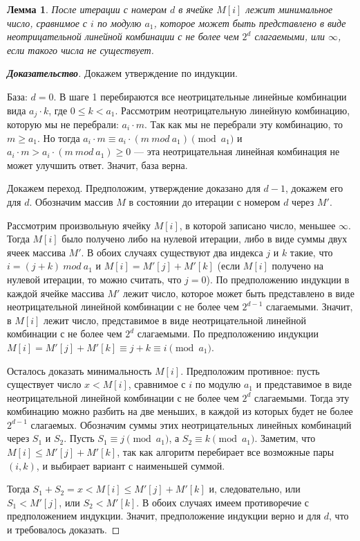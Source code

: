 \documentclass[12pt]{article}
\newtheorem{lemma}[theorem]{Лемма}
\theoremstyle{definition}
\begin{document}
\begin{lemma}
\label{algorithm:lemma2}
После итерации с номером $d$ в ячейке $M[i]$ лежит минимальное число, сравнимое с $i$ по модулю $a_1$, которое может быть представлено в виде неотрицательной линейной комбинации с не более чем $2^d$ слагаемыми, или $\infty$, если такого числа не существует.
\end{lemma}
\begin{proof}[\textbf{Доказательство}]
Докажем утверждение по индукции.

База: $d = 0$. В шаге 1 перебираются все неотрицательные линейные комбинации вида $a_j \cdot k$, где $0 \le k < a_1$. Рассмотрим неотрицательную линейную комбинацию, которую мы не перебрали: $a_i \cdot m$. Так как мы не перебрали эту комбинацию, то $m \ge a_1$. Но тогда $a_i \cdot m \equiv a_i \cdot (m \ mod \ a_1) \pmod {a_1}$ и $a_i \cdot m > a_i \cdot (m \ mod \ a_1) \ge 0$ --- эта неотрицательная линейная комбинация не может улучшить ответ. Значит, база верна.

Докажем переход. Предположим, утверждение доказано для $d - 1$, докажем его для $d$. Обозначим массив $M$ в состоянии до итерации с номером $d$ через $M'$.

Рассмотрим произвольную ячейку $M[i]$, в которой записано число, меньшее $\infty$. Тогда $M[i]$ было получено либо на нулевой итерации, либо в виде суммы двух ячеек массива $M'$. В обоих случаях существуют два индекса $j$ и $k$ такие, что $i = (j + k) \ mod \ a_1$ и $M[i] = M'[j] + M'[k]$ (если $M[i]$ получено на нулевой итерации, то можно считать, что $j = 0$). По предположению индукции в каждой ячейке массива $M'$ лежит число, которое может быть представлено в виде неотрицательной линейной комбинации с не более чем $2^{d - 1}$ слагаемыми. Значит, в $M[i]$ лежит число, представимое в виде неотрицательной линейной комбинации с не более чем $2^d$ слагаемыми. По предположению индукции $M[i] = M'[j] + M'[k] \equiv j + k \equiv i \pmod{a_1}$.

Осталось доказать минимальность $M[i]$. Предположим противное: пусть существует число $x < M[i]$, сравнимое с $i$ по модулю $a_1$ и представимое в виде неотрицательной линейной комбинации с не более чем $2^d$ слагаемыми. Тогда эту комбинацию можно разбить на две меньших, в каждой из которых будет не более $2^{d - 1}$ слагаемых. Обозначим суммы этих неотрицательных линейных комбинаций через $S_1$ и $S_2$. Пусть $S_1 \equiv j \pmod{a_1}$, а $S_2 \equiv k \pmod{a_1}$. Заметим, что $M[i] \le M'[j] + M'[k]$, так как алгоритм перебирает все возможные пары $(i, k)$, и выбирает вариант с наименьшей суммой.

Тогда $S_1 + S_2 = x < M[i] \le M'[j] + M'[k]$ и, следовательно, или $S_1 < M'[j]$, или $S_2 < M'[k]$. В обоих случаях имеем противоречие с предположением индукции. Значит, предположение индукции верно и для $d$, что и требовалось доказать.
\end{proof}
\end{document}

